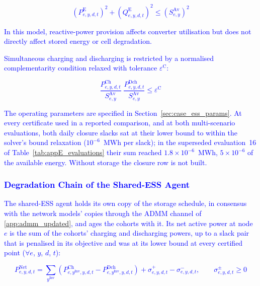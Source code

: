 \documentclass[preprint,12pt]{elsarticle}
\begin{document}
\textcolor{blue}{
    \begin{equation}
        \left(P^{\text{E}}_{e,y,d,t}\right)^2
        + \left(Q^{\text{E}}_{e,y,d,t}\right)^2
        \le \left(S^{\text{Av}}_{e,y}\right)^2
        \label{eq:converter_capability}
    \end{equation}
}

\textcolor{blue}{
    In this model, reactive-power provision affects converter utilisation but does not directly affect stored energy or cell degradation.
}

\textcolor{blue}{Simultaneous charging and discharging is restricted by a normalised complementarity condition relaxed with tolerance $\varepsilon^{\text{C}}$:}

\textcolor{blue}{
    \begin{equation}
        \frac{P^{\text{Ch}}_{e,y,d,t}}{S^{\text{Av}}_{e,y}} \; \frac{P^{\text{Dch}}_{e,y,d,t}}{S^{\text{Av}}_{e,y}} \le \varepsilon^{\text{C}}
        \label{eq:network_complementarity}
    \end{equation}
}

\textcolor{blue}{
    The operating parameters are specified in Section~\ref{sec:case_ess_params}.
    At every certificate used in a reported comparison, and at both multi-scenario evaluations, both daily closure slacks sat at their lower bound to within the solver's bound relaxation ($10^{-6}$~MWh per slack); in the superseded evaluation~16 of Table~\ref{tab:appE_evaluations} their sum reached $1.8 \times 10^{-6}$~MWh, $5 \times 10^{-6}$ of the available energy. Without storage the closure row is not built.
}

\subsubsection{\textcolor{blue}{Degradation Chain of the Shared-ESS Agent}}

\textcolor{blue}{The shared-ESS agent holds its own copy of the storage schedule, in consensus with the network models' copies through the ADMM channel of \ref{app:admm_updated}, and ages the cohorts with it. Its net active power at node $e$ is the sum of the cohorts' charging and discharging powers, up to a slack pair that is penalised in its objective and was at its lower bound at every certified point ($\forall e$, $y$, $d$, $t$):}

\textcolor{blue}{
    \begin{equation}
        P^{\text{Net}}_{e,y,d,t} = \sum_{y^\text{Inv}} \left( P^{\text{Ch}}_{e,y^\text{Inv},y,d,t} - P^{\text{Dch}}_{e,y^\text{Inv},y,d,t} \right)
        + \sigma^{+}_{e,y,d,t} - \sigma^{-}_{e,y,d,t}, \qquad \sigma^{\pm}_{e,y,d,t} \ge 0
        \label{eq:esso_net_power}
    \end{equation}
}
\end{document}
